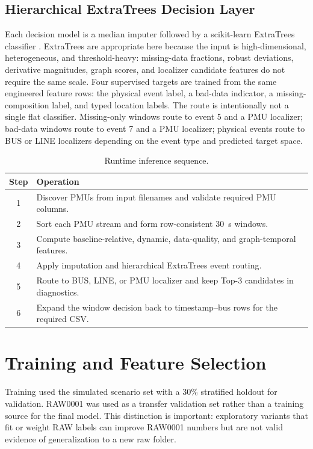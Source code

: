 \documentclass[conference]{IEEEtran}
\begin{document}
\subsection{Hierarchical ExtraTrees Decision Layer}
Each decision model is a median imputer followed by a scikit-learn ExtraTrees classifier \cite{geurts2006,pedregosa2011}. ExtraTrees are appropriate here because the input is high-dimensional, heterogeneous, and threshold-heavy: missing-data fractions, robust deviations, derivative magnitudes, graph scores, and localizer candidate features do not require the same scale. Four supervised targets are trained from the same engineered feature rows: the physical event label, a bad-data indicator, a missing-composition label, and typed location labels. The route is intentionally not a single flat classifier. Missing-only windows route to event 5 and a PMU localizer; bad-data windows route to event 7 and a PMU localizer; physical events route to BUS or LINE localizers depending on the event type and predicted target space.

\begin{table}[t]
\centering
\caption{Runtime inference sequence.}
\label{tab:runtime}
\renewcommand{\arraystretch}{1.08}
\footnotesize
\begin{tabular}{@{}cp{}@{}}
\toprule
\textbf{Step} & \textbf{Operation} \\
\midrule
1 & Discover PMUs from input filenames and validate required PMU columns. \\
2 & Sort each PMU stream and form row-consistent 30~s windows. \\
3 & Compute baseline-relative, dynamic, data-quality, and graph-temporal features. \\
4 & Apply imputation and hierarchical ExtraTrees event routing. \\
5 & Route to BUS, LINE, or PMU localizer and keep Top-3 candidates in diagnostics. \\
6 & Expand the window decision back to timestamp--bus rows for the required CSV. \\
\bottomrule
\end{tabular}
\end{table}

\section{Training and Feature Selection}
\label{sec:training}
Training used the simulated scenario set with a 30\% stratified holdout for validation. RAW0001 was used as a transfer validation set rather than a training source for the final model. This distinction is important: exploratory variants that fit or weight RAW labels can improve RAW0001 numbers but are not valid evidence of generalization to a new raw folder.
\end{document}
